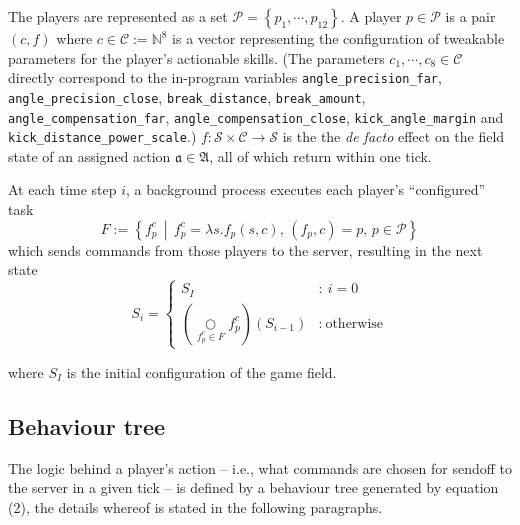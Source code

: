 The players are represented as a set \(\mathcal{P}=\left\{p_1,\cdots,p_{12}\right\}\). A player \(p \in \mathcal{P}\) is a pair \((c, f)\) where \(c \in \mathcal{C} := \mathbb{N}^8\) is a vector representing the configuration of tweakable parameters for the player's actionable skills. (The parameters \(c_1,\cdots,c_8\in \mathcal{C}\) directly correspond to the in-program variables
\texttt{angle\_precision\_far}, \texttt{angle\_precision\_close}, \texttt{break\_distance}, \texttt{break\_amount}, \texttt{angle\_compensation\_far}, \texttt{angle\_compensation\_close}, \texttt{kick\_angle\_margin} and \texttt{kick\_distance\_power\_scale}.) \(f : \mathcal{S}\times \mathcal{C} \to \mathcal{S}\) is the the \textit{de facto} effect on the field state of an assigned action \(\mathfrak{a}\in\mathfrak{A}\), all of which return within one tick.

At each time step \(i\), a background process executes each player's ``configured'' task
\[
		F := \left\{ f_p^c \,\middle|\, f_p^c = \lambda s.f_p(s, c),\, (f_p, c) = p,\, p \in\mathcal{P} \right\}
\]
which sends commands from those players to the server, resulting in the next state
\begin{equation}
		S_{i} = \left\{
			\begin{array}{cl}
				S_I & : \ i = 0 \\
				\left(\underset{f_p^c\in F}\bigcirc f_p^c\right)(S_{i-1}) & : \ \text{otherwise}
			\end{array}
		\right. %
\end{equation}

where \(S_I\) is the initial configuration of the game field.

\subsection{Behaviour tree}
The logic behind a player's action -- i.e., what commands are chosen for sendoff to the server in a given tick -- is defined by a behaviour tree generated by equation (2), the details whereof is stated in the following paragraphs.

